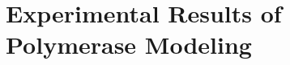 \chapter{Experimental Results of Polymerase Modeling} %
\label{cha:experimental_results_of_polymerase_modeling}

